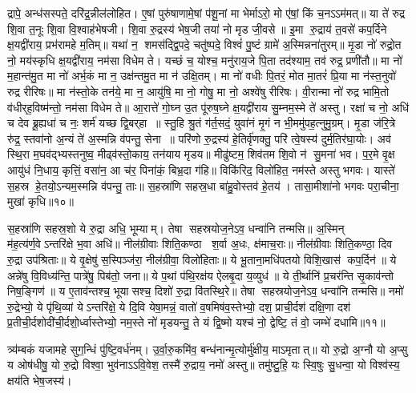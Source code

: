 द्रापे॒ अन्ध॑सस्पते॒ दरि॑द्र॒न्नील॑लोहित। ए॒षां पुरु॑षाणामे॒षां प॑शू॒नां मा भेर्माऽरो॒ मो ए॑षां॒ किं च॒नऽऽम॑मत्॥ या ते॑ रुद्र शि॒वा त॒नूः शि॒वा वि॒श्वाह॑भेषजी। शि॒वा रु॒द्रस्य॑ भेष॒जी तया॑ नो मृड जी॒वसे॥ इ॒मा रु॒द्राय॑ त॒वसे॑ कप॒र्दिने क्ष॒यद्वी॑राय॒ प्रभ॑रामहे म॒तिम्॥ यथा॑ न॒ शमस॑द्द्वि॒पदे॒ चतु॑ष्पदे॒ विश्वं॑ पु॒ष्टं ग्रामे॑ अ॒स्मिन्नना॑तुरम्॥ मृ॒डा नो॑ रुद्रो॒त नो॒ मय॑स्कृधि क्ष॒यद्वी॑राय॒ नम॑सा विधेम ते। यच्छं च॒ योश्च॒ मनु॑राय॒जे पि॒ता तद॑श्याम॒ तव॑ रुद्र॒ प्रणी॑तौ॥ मा नो॑ म॒हान्त॑मु॒त मा नो॑ अर्भ॒कं मा न॒ उक्ष॑न्तमु॒त मा न॑ उक्षि॒तम्। मा नो॑ वधीः पि॒तरं॒ मोत मा॒तरं॑ प्रि॒या मा न॑स्त॒नुवो॑ रुद्र रीरिषः॥ मा न॑स्तो॒के तन॑ये॒ मा न॒ आयु॑षि॒ मा नो॒ गोषु॒ मा नो॒ अश्वे॑षु रीरिषः। वी॒रान्मा नो॑ रुद्र भामि॒तो व॑धीर्‌ह॒विष्म॑न्तो॒ नम॑सा विधेम ते॥ आ॒रात्ते॑ गो॒घ्न उ॒त पू॑रुष॒घ्ने क्ष॒यद्वी॑राय सु॒म्नम॒स्मे ते॑ अस्तु। रक्षा॑ च नो॒ अधि॑ च देव ब्रू॒ह्यधा॑ च नः॒ शर्म॑ यच्छ द्वि॒बर्‌हा॥ स्तु॒हि श्रु॒तं ग॑र्त॒सदं॒ युवा॑नं मृ॒गं न भी॒ममु॑पह॒त्नुमु॒ग्रम्। मृ॒डा ज॑रि॒त्रे रु॑द्र॒ स्तवा॑नो अ॒न्यं ते॑ अ॒स्मन्नि व॑पन्तु॒ सेना॥ परि॑णो रु॒द्रस्य॑ हे॒तिर्वृ॑णक्तु॒ परि॑ त्वे॒षस्य॑ दुर्म॒तिर॑घा॒योः। अव॑ स्थि॒रा म॒घव॑द्भ्यस्तनुष्व॒ मीढ्व॑स्तो॒काय॒ तन॑याय मृडय॥ मीढु॑ष्टम॒ शिव॑तम शि॒वो न॑ सु॒मना॑ भव। प॒र॒मे वृ॒क्ष आयु॑धं नि॒धाय॒ कृत्तिं॒ वसा॑न॒ आ च॑र॒ पिना॑कं॒ बिभ्र॒दा ग॑हि॥ विकि॑रिद॒ विलो॑हित॒ नम॑स्ते अस्तु भगवः। यास्ते॑ स॒हस्र हे॒तयो॒ऽन्यम॒स्मन्नि व॑पन्तु॒ ताः॥ स॒हस्रा॑णि सहस्र॒धा बा॑हु॒वोस्तव॑ हे॒तय॑। तासा॒मीशा॑नो भगवः परा॒चीना॒ मुखा॑ कृधि॥१०॥

स॒हस्रा॑णि सहस्र॒शो ये रु॒द्रा अधि॒ भूम्याम्। तेषा सहस्रयोज॒नेऽव॒ धन्वा॑नि तन्मसि॥ अ॒स्मिन् म॑ह॒त्य॑र्ण॒वे\-ऽन्तरि॑क्षे भ॒वा अधि॑॥ नील॑ग्रीवाः शिति॒कण्ठा श॒र्वा अ॒धः, क्ष॑माच॒राः॥ नील॑ग्रीवाः शिति॒कण्ठा॒ दिव रु॒द्रा उप॑श्रिताः॥ ये वृ॒क्षेषु॑ स॒स्पिञ्ज॑रा॒ नील॑ग्रीवा॒ विलो॑हिताः॥ ये भू॒ताना॒मधि॑पतयो विशि॒खास॑ कप॒र्दिन॑॥ ये अन्ने॑षु वि॒विध्य॑न्ति॒ पात्रे॑षु॒ पिब॑तो॒ जना\sn ॥ ये प॒थां प॑थि॒रक्ष॑य ऐलबृ॒दा य॒व्युध॑॥ ये ती॒र्थानि॑ प्र॒चर॑न्ति सृ॒काव॑न्तो निष॒ङ्गिण॑॥ य ए॒ताव॑न्तश्च॒ भूयासश्च॒ दिशो॑ रु॒द्रा वि॑तस्थि॒रे॥ तेषा सहस्रयोज॒नेऽव॒ धन्वा॑नि तन्मसि॥ नमो॑ रु॒द्रेभ्यो॒ ये पृ॑थि॒व्यां येऽन्तरि॑क्षे॒ ये दि॒वि येषा॒मन्नं॒ वातो॑ व॒\ar षमिष॑व॒स्तेभ्यो॒ दश॒ प्राची॒र्दश॑ दक्षि॒णा दश॑ प्र॒तीची॒र्दशो\-दी॑ची॒र्दशो॒र्ध्वास्तेभ्यो॒ नम॒स्ते नो॑ मृडयन्तु॒ ते यं द्वि॒ष्मो यश्च॑ नो॒ द्वेष्टि॒ तं वो॒ जम्भे॑ दधामि॥११॥ 

\lbrack त्र्य॑म्बकं यजामहे सुग॒न्धिं पु॑ष्टि॒वर्ध॑नम्। उ॒र्वा॒रु॒कमि॑व॒ बन्ध॑नान्मृ॒त्योर्मु॑क्षीय॒ माऽमृतात्॥ यो रु॒द्रो अ॒ग्नौ यो अ॒प्सु य ओष॑धीषु॒ यो रु॒द्रो विश्वा॒ भुव॑नाऽऽवि॒वेश॒ तस्मै॑ रु॒द्राय॒ नमो॑ अस्तु॥ तमु॑ष्टु॒हि॒ यः स्वि॒षुः सु॒धन्वा॒ यो विश्व॑स्य॒ क्षय॑ति भेष॒जस्य॑। 

